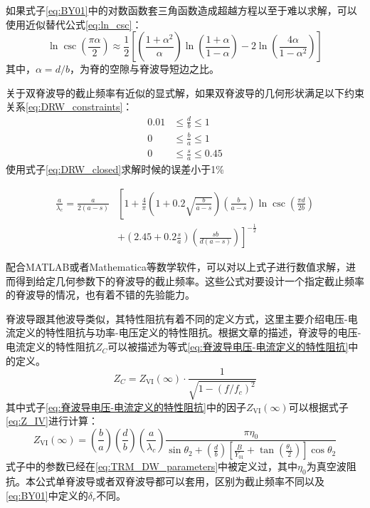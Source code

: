 \documentclass[master]{thesis-uestc}
\begin{document}
如果式子\ref{eq:BY01}中的对数函数套三角函数造成超越方程以至于难以求解，可以使用近似替代公式\ref{eq:ln_csc}：
\begin{equation}
    \ln \csc \left( \frac{\pi \alpha}{2} \right) \approx \frac{1}{2} \left[ \left( \frac{1 + \alpha^2}{\alpha} \right) \ln \left( \frac{1 + \alpha}{1 - \alpha} \right) - 2 \ln \left( \frac{4 \alpha}{1 - \alpha^2} \right) \right] \label{eq:ln_csc}
\end{equation}
其中，$\alpha=d/b$，为脊的空隙与脊波导短边之比。

关于双脊波导的截止频率有近似的显式解，如果双脊波导的几何形状满足以下约束关系\ref{eq:DRW_constraints}：
\begin{equation}\label{eq:DRW_constraints}
    \begin{aligned}
    0.01 &\leq \frac{d}{b} \leq 1 \\
    0 &\leq \frac{b}{a} \leq 1 \\
    0 &\leq \frac{s}{a} \leq 0.45
    \end{aligned}
\end{equation}
使用式子\ref{eq:DRW_closed}求解时候的误差小于1\%

\begin{equation}\label{eq:DRW_closed}
    \begin{split}
        \frac{a}{\lambda_c} = \frac{a}{2(a - s)} & \left[ 1 + \frac{4}{\pi} \left( 1 + 0.2 \sqrt{\frac{b}{a - s}} \right) \left( \frac{b}{a - s} \right) \ln \csc \left( \frac{\pi d}{2b} \right) \right. \\
        & \left. + \left( 2.45 + 0.2 \frac{s}{a} \right) \left( \frac{sb}{d(a - s)} \right) \right]^{-\frac{1}{2}}
    \end{split}
\end{equation}

配合MATLAB或者Mathematica等数学软件，可以对以上式子进行数值求解，进而得到给定几何参数下的脊波导的截止频率。这些公式对要设计一个指定截止频率的脊波导的情况，也有着不错的先验能力。

脊波导跟其他波导类似，其特性阻抗有着不同的定义方式，这里主要介绍电压-电流定义的特性阻抗与功率-电压定义的特性阻抗。根据文章\cite{Hoefer1982AnalyticalEF}的描述，脊波导的电压-电流定义的特性阻抗\(Z_C\)可以被描述为等式\ref{eq:脊波导电压-电流定义的特性阻抗}中的定义。
\begin{equation}\label{eq:脊波导电压-电流定义的特性阻抗}
    Z_C = Z_{\mathrm{VI}}(\infty) \cdot \frac{1}{\sqrt{1-(f/f_c)^2}}
\end{equation}
其中式子\ref{eq:脊波导电压-电流定义的特性阻抗}中的因子\(Z_{\mathrm{VI}}(\infty)\)可以根据式子\ref{eq:Z_IV}进行计算：
\begin{equation}\label{eq:Z_IV}
    Z_{\mathrm{VI}}(\infty) = \left( \frac{b}{a} \right) \left( \frac{d}{b} \right) \left( \frac{a}{\lambda_c} \right) \frac{\pi \eta_0}{\sin \theta_2 + \left( \frac{d}{b} \right) \left[ \frac{B}{Y_{01}} + \tan \left( \frac{\theta_1}{2} \right) \right] \cos \theta_2}
\end{equation}
式子中的参数已经在\ref{eq:TRM_DW_parameters}中被定义过，其中$\eta_0$为真空波阻抗。本公式单脊波导或者双脊波导都可以套用，区别为截止频率不同以及\ref{eq:BY01}中定义的$\delta_{r}$不同。
\end{document}
